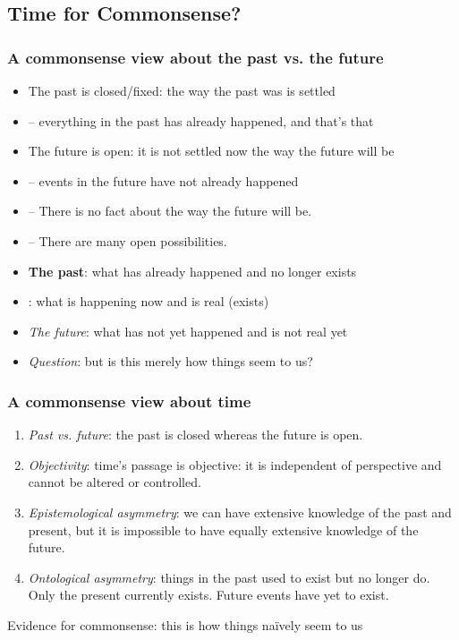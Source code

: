 \subsection{Time for Commonsense?}

\begin{frame}
\frametitle{A commonsense view about the past vs. the future }

\begin{itemize}[<+->]

\item The past is closed/fixed: the way the past was is settled
\item[] -- everything in the past has already happened, and that’s that

\item The future is open: it is not settled now the way the future will be
\item[] -- events in the future have not already happened
\item[] -- There is no fact about the way the future will be. 
\item[] -- There are many open possibilities.

\item \textbf{The past}: what has already happened and no longer exists
\item {}: what is happening now and is real (exists)
\item \emph{The future}: what has not yet happened and is not real yet

\item \textit{Question}: but is this merely how things seem to us?



\end{itemize}
\end{frame}




\begin{frame}
\frametitle{A commonsense view about time}

\begin{enumerate}[<+->]

\item \textit{Past vs. future}: the past is closed whereas the future is open.

\item \textit{Objectivity}: time’s passage is objective: it is independent of perspective and cannot be altered or controlled.

\item \textit{Epistemological asymmetry}: we can have extensive knowledge of the past and present, but it is impossible to have equally extensive knowledge of the future.

\item \textit{Ontological asymmetry}: things in the past used to exist but no longer do. Only the present currently exists. Future events have yet to exist.

\end{enumerate}
\pause 
Evidence for commonsense: this is how things na\"ively seem to us 

\end{frame}

